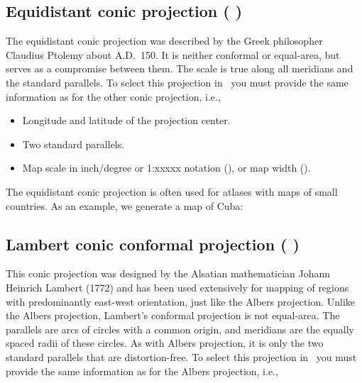 

\subsection{Equidistant conic projection ( )}

The equidistant conic projection was described by the Greek
philosopher Claudius Ptolemy about A.D.\ 150.  It is neither
conformal or equal-area, but serves as a compromise between them.
The scale is true along all meridians and the standard parallels.
To select this projection in \GMT\ you must
provide the same information as for the other conic projection, i.e.,

\begin{itemize}
\item Longitude and latitude of the projection center.
\item Two standard parallels.
\item Map scale in inch/degree or 1:xxxxx notation (), or map width ().
\end{itemize}

The equidistant conic projection is often used for atlases with
maps of small countries.  As an example, we generate a map of
Cuba:




\subsection{Lambert conic conformal projection ( )}

This conic projection was designed by the Alsatian mathematician Johann Heinrich Lambert (1772) and has been
used extensively for mapping of regions with predominantly east-west
orientation, just like the Albers projection.  Unlike the Albers
projection, Lambert's conformal projection is not equal-area.
The parallels are arcs of circles with a common origin, and
meridians are the equally spaced radii of these circles.  As with
Albers projection, it is only the two standard parallels that are
distortion-free.  To select this projection in \GMT\ you must
provide the same information as for the Albers projection, i.e.,

